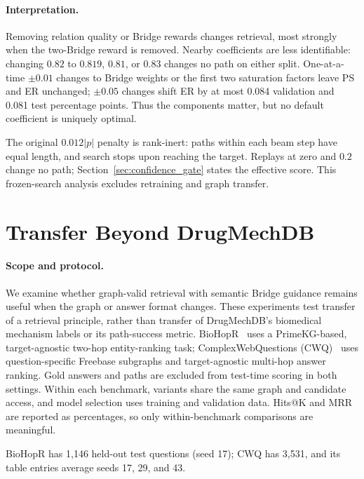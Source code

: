 \documentclass{article} %
\begin{document}
\paragraph{Interpretation.}
Removing relation quality or Bridge rewards changes retrieval, most strongly when the two-Bridge reward is removed. Nearby coefficients are less identifiable: changing $0.82$ to $0.819$, $0.81$, or $0.83$ changes no path on either split. One-at-a-time $\pm0.01$ changes to Bridge weights or the first two saturation factors leave PS and ER unchanged; $\pm0.05$ changes shift ER by at most 0.084 validation and 0.081 test percentage points. Thus the components matter, but no default coefficient is uniquely optimal.

The original $0.012|p|$ penalty is rank-inert: paths within each beam step have equal length, and search stops upon reaching the target. Replays at zero and $0.2$ change no path; Section~\ref{sec:confidence_gate} states the effective score. This frozen-search analysis excludes retraining and graph transfer.
\normalsize

\section{Transfer Beyond DrugMechDB}
\label{app:transfer}

\paragraph{Scope and protocol.}
We examine whether graph-valid retrieval with semantic Bridge guidance remains useful when the graph or answer format changes. These experiments test transfer of a retrieval principle, rather than transfer of DrugMechDB's biomedical mechanism labels or its path-success metric. BioHopR~\citep{kim2025biohopr} uses a PrimeKG-based, target-agnostic two-hop entity-ranking task; ComplexWebQuestions (CWQ)~\citep{talmor2018web} uses question-specific Freebase subgraphs and target-agnostic multi-hop answer ranking. Gold answers and paths are excluded from test-time scoring in both settings. Within each benchmark, variants share the same graph and candidate access, and model selection uses training and validation data. Hits@K and MRR are reported as percentages, so only within-benchmark comparisons are meaningful.

BioHopR has 1,146 held-out test questions (seed 17); CWQ has 3,531, and its table entries average seeds 17, 29, and 43.
\end{document}
